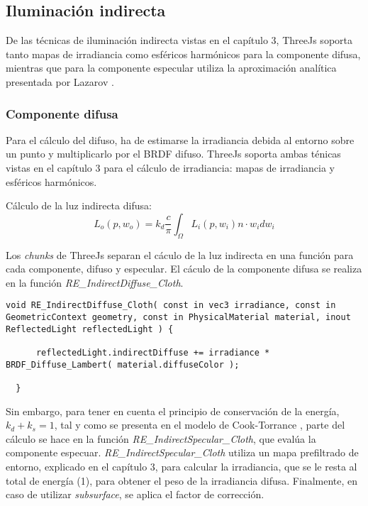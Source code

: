   \subsection{Iluminaci\'on indirecta}
    De las t\'ecnicas de iluminaci\'on indirecta vistas en el cap\'itulo 3, ThreeJs soporta tanto mapas de
    irradiancia como esf\'ericos harm\'onicos para la componente difusa, mientras que para la componente
    especular utiliza la aproximaci\'on anal\'itica presentada por Lazarov \autocite{blackops}.

    \subsubsection{Componente difusa}
      Para el c\'alculo del difuso, ha de estimarse la irradiancia debida al entorno sobre un punto y multiplicarlo
      por el BRDF difuso. ThreeJs soporta ambas t\'enicas vistas en el cap\'itulo 3 para el c\'alculo de irradiancia:
      mapas de irradiancia y esf\'ericos harm\'onicos.

      C\'alculo de la luz indirecta difusa: \\

      \begin{equation}
        L_o(p, w_o) = k_d \frac{c}{\pi} \int_{\Omega}{L_i(p, w_i) n\cdot{w_i}dw_i}
      \end{equation}
      \singlespacing

      Los \textit{chunks} de ThreeJs separan el c\'aculo de la luz indirecta en una funci\'on para cada componente, difuso
      y especular. El c\'aculo de la componente difusa se realiza en la funci\'on \textit{RE\_IndirectDiffuse\_Cloth}.\\

      \begin{lstlisting}[caption=C\'alculo de la ecuaci\'on de render para la componente difusa de \textit{MeshClothMaterial}]
  void RE_IndirectDiffuse_Cloth( const in vec3 irradiance, const in GeometricContext geometry, const in PhysicalMaterial material, inout ReflectedLight reflectedLight ) {
  
      reflectedLight.indirectDiffuse += irradiance * BRDF_Diffuse_Lambert( material.diffuseColor );
  
  }
      \end{lstlisting}

      Sin embargo, para tener en cuenta el principio de conservaci\'on de la energ\'ia, $k_d + k_s = 1$, tal y como se
      presenta en el modelo de Cook-Torrance \autocite{cooktorrance}, parte del c\'alculo se hace en la funci\'on
      \textit{RE\_IndirectSpecular\_Cloth}, que eval\'ua la componente especuar. \textit{RE\_IndirectSpecular\_Cloth}
      utiliza un mapa prefiltrado de entorno, explicado en el cap\'itulo 3, para calcular la irradiancia, que se le resta al
      total de energ\'ia (1), para obtener el peso de la irradiancia difusa. Finalmente, en caso de utilizar \textit{subsurface},
      se aplica el factor de correcci\'on.\\



